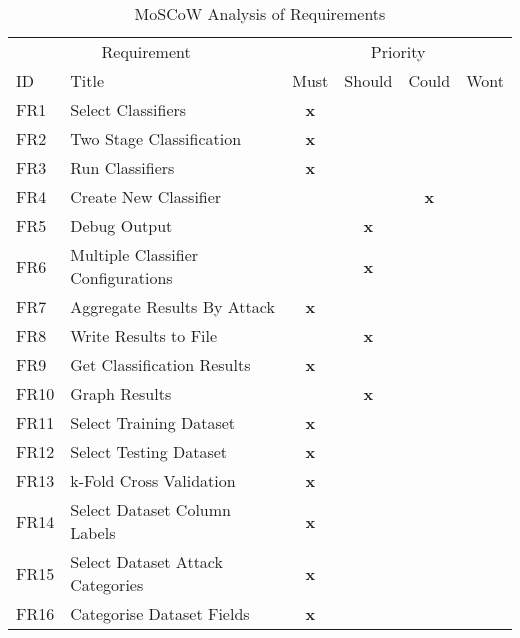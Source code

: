 \begin{table}[H]
\centering
\caption{MoSCoW Analysis of Requirements}
\label{my-label}
\begin{adjustbox}{center=\textwidth}
\begin{tabular}{@{}llcccc@{}}
\toprule
\multicolumn{2}{c}{Requirement} & \multicolumn{4}{c}{Priority} \\ 
\cmidrule(lr){1-2}
\cmidrule(lr){3-6}
ID & Title & Must & Should & Could & Wont \\ \midrule
FR1 & Select Classifiers                 & \textbf{x} & \textbf{} & \textbf{} & \textbf{} \\
FR2 & Two Stage Classification           & \textbf{x} & \textbf{} & \textbf{} & \textbf{} \\
FR3 & Run Classifiers                    & \textbf{x} & \textbf{} & \textbf{} & \textbf{} \\
FR4 & Create New Classifier              & \textbf{} & \textbf{} & \textbf{x} & \textbf{} \\
FR5 & Debug Output                       & \textbf{} & \textbf{x} & \textbf{} & \textbf{} \\
FR6 & Multiple Classifier Configurations & \textbf{} & \textbf{x} & \textbf{} & \textbf{} \\
FR7 & Aggregate Results By Attack        & \textbf{x} & \textbf{} & \textbf{} & \textbf{} \\
FR8 & Write Results to File              & \textbf{} & \textbf{x} & \textbf{} & \textbf{} \\
FR9 & Get Classification Results         & \textbf{x} & \textbf{} & \textbf{} & \textbf{} \\
FR10 & Graph Results                     & \textbf{} & \textbf{x} & \textbf{} & \textbf{} \\
FR11 & Select Training Dataset           & \textbf{x} & \textbf{} & \textbf{} & \textbf{} \\
FR12 & Select Testing Dataset            & \textbf{x} & \textbf{} & \textbf{} & \textbf{} \\
FR13 & k-Fold Cross Validation           & \textbf{x} & \textbf{} & \textbf{} & \textbf{} \\
FR14 & Select Dataset Column Labels      & \textbf{x} & \textbf{} & \textbf{} & \textbf{} \\
FR15 & Select Dataset Attack Categories  & \textbf{x} & \textbf{} & \textbf{} & \textbf{} \\
FR16 & Categorise Dataset Fields         & \textbf{x} & \textbf{} & \textbf{} & \textbf{} \\

\end{tabular}
\end{adjustbox}
\end{table}
